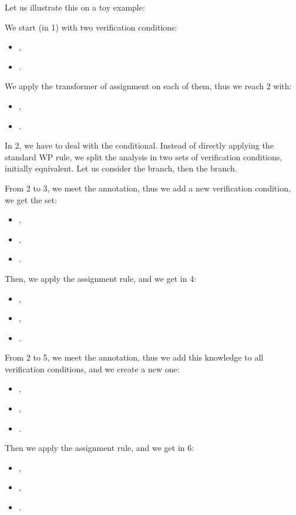 Let us illustrate this on a toy example:




We start (in 1) with two verification conditions:
\begin{itemize}
  \item {},
  \item {}.
\end{itemize}
We apply the transformer of assignment on each of them, thus we reach 2 with:
\begin{itemize}
  \item {},
  \item {}.
\end{itemize}
In 2, we have to deal with the conditional. Instead of directly applying the
standard WP rule, we split the analysis in two sets of verification conditions,
initially equivalent. Let us consider the  branch, then the
 branch.


From 2 to 3, we meet the  annotation, thus we add a new
verification condition, we get the set:
\begin{itemize}
  \item {},
  \item {},
  \item {}.
\end{itemize}
Then, we apply the assignment rule, and we get in 4:
\begin{itemize}
  \item {},
  \item {},
  \item {}.
\end{itemize}


From 2 to 5, we meet the  annotation, thus we add this
knowledge to all verification conditions, and we create a new one:
\begin{itemize}
  \item {},
  \item {},
  \item {}.
\end{itemize}
Then we apply the assignment rule, and we get in 6:
\begin{itemize}
  \item {},
  \item {},
  \item {}.
\end{itemize}


